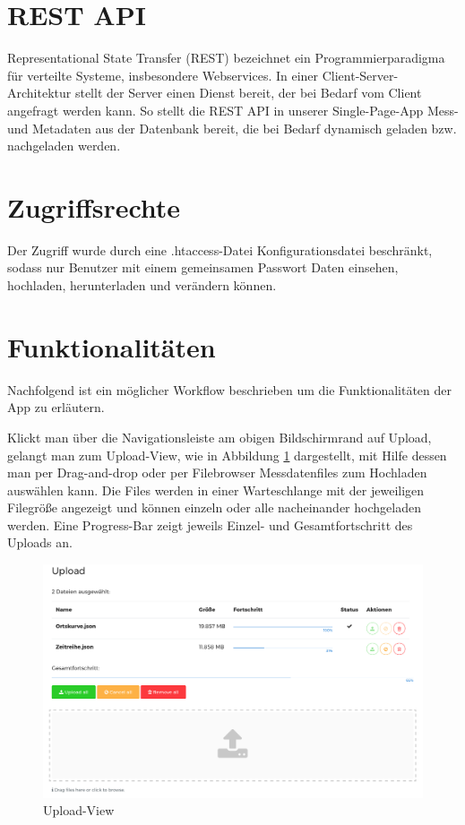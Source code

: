 




\section{REST API}

Representational State Transfer (REST) bezeichnet ein Programmierparadigma für verteilte Systeme, insbesondere Webservices. In einer Client-Server-Architektur stellt der Server einen Dienst bereit, der bei Bedarf vom Client angefragt werden kann. So stellt die REST API in unserer Single-Page-App Mess- und Metadaten aus der Datenbank bereit, die bei Bedarf dynamisch geladen bzw. nachgeladen werden.


\section{Zugriffsrechte}

Der Zugriff wurde durch eine .htaccess-Datei Konfigurationsdatei beschränkt, sodass nur Benutzer mit einem gemeinsamen Passwort Daten einsehen, hochladen, herunterladen und verändern können.


\section{Funktionalitäten} 

Nachfolgend ist ein möglicher Workflow beschrieben um die Funktionalitäten der App zu erläutern.

Klickt man über die Navigationsleiste am obigen Bildschirmrand auf Upload, gelangt man zum Upload-View, wie in Abbildung \ref{fig:upload} dargestellt, mit Hilfe dessen man per Drag-and-drop oder per Filebrowser Messdatenfiles zum Hochladen auswählen kann. Die Files werden in einer Warteschlange mit der jeweiligen Filegröße angezeigt und können einzeln oder alle nacheinander hochgeladen werden. Eine Progress-Bar zeigt jeweils Einzel- und Gesamtfortschritt des Uploads an.

\begin{figure}
\centering
\includegraphics[width=\textwidth]{Figures/upload}
\caption{Upload-View}
\label{fig:upload}
\end{figure}

